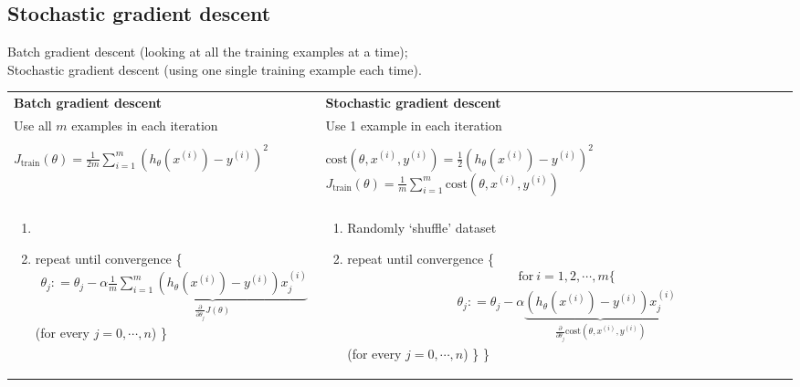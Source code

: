 \subsection{Stochastic gradient descent}
Batch gradient descent (looking at all the training examples at a time);\\
Stochastic gradient descent (using one single training example each time).
\begin{center}
\begin{tabular}{ p{7cm} | p{7cm}}
\hline
\textbf{Batch gradient descent} & \textbf{Stochastic gradient descent}\\
Use all $m$ examples in each iteration & Use 1 example in each iteration\\
\hline
\\
$J_{\text{train}}(\theta) = \frac{1}{2m}\sum_{i=1}^m(h_{\theta}(x^{(i)}) -y^{(i)})^2$
&
${\text{cost}}(\theta, x^{(i)}, y^{(i)}) = \frac{1}{2}(h_{\theta}(x^{(i)}) -y^{(i)})^2$
$J_{\text{train}}(\theta) = \frac{1}{m}\sum_{i=1}^m\text{cost}(\theta, x^{(i)}, y^{(i)})$\\
\\
\hline
\begin{enumerate}
    \item[]
    \item[]
	repeat until convergence \{
	\begin{align*}
	\theta_j: = \theta_j - \alpha \frac{1}{m} \underbrace{\sum_{i=1}^m (h_\theta(x^{(i)}) - y^{(i)}) x_j^{(i)}}_{\frac{\partial }{\partial \theta_j} J(\theta)}
	\end{align*}	
	(for every $j=0, \cdots, n$)
	\}
\end{enumerate}
&
\begin{enumerate}
    \item
    Randomly `shuffle' dataset
    \item
    {repeat until convergence} \{
    	\begin{align*}
    	\text{for} ~ i = 1,2, \cdots, m \{
        \end{align*}	
    	\begin{align*}
    	\theta_j: = \theta_j - \alpha \underbrace{(h_\theta(x^{(i)}) - y^{(i)}) x_j^{(i)}}_{\frac{\partial }{\partial \theta_j} {\text{cost}}(\theta, x^{(i)}, y^{(i)})}
    	\end{align*}	
    	(for every $j=0, \cdots, n$)
    	\}
    	\}
\end{enumerate}
\\
\hline
\end{tabular}
\end{center}

